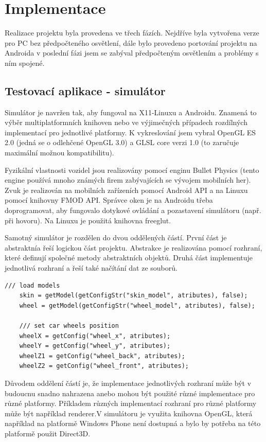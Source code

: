 \documentclass[11pt,twoside,a4paper]{book}
\begin{document}
\chapter{Implementace}
Realizace projektu byla provedena ve třech fázích. Nejdříve byla vytvořena verze pro PC bez předpočteného osvětlení, dále bylo provedeno portování projektu na Android\linebreak a v poslední fázi jsem se zabýval předpočteným osvětlením a problémy s ním spojené.

\section{Testovací aplikace - simulátor}
Simulátor je navržen tak, aby fungoval na X11-Linuxu a Androidu. Znamená to výběr multiplatformních knihoven nebo ve výjimečných případech rozdílných implementací pro jednotlivé platformy. K vykreslování jsem vybral OpenGL ES 2.0 (jedná se o odlehčené OpenGL 3.0) a GLSL core verzi 1.0 (to zaručuje maximální možnou kompatibilitu).

Fyzikální vlastnosti vozidel jsou realizovány pomocí enginu Bullet Physics (tento engine používá mnoho známých firem zabývajících se vývojem mobilních her). Zvuk je realizován na mobilních zařízeních pomocí Android API a na Linuxu pomocí knihovny FMOD API. Správce oken je na Androidu třeba doprogramovat, aby fungovalo dotykové ovládání a pozastavení simulátoru (např. při hovoru). Na Linuxu je použitá knihovna freeglut.

Samotný simulátor je rozdělen do dvou oddělených částí. První část je abstraktní\linebreak a řeší logickou část projektu. Abstrakce je realizována pomocí rozhraní, které definují společné metody abstraktních objektů. Druhá část implementuje jednotlivá rozhraní a řeší také načítání dat ze souborů.
\lstset{language=C++} 
\begin{lstlisting}[caption=Načtení 3D modelu vozidla pomocí abstraktního přístupu]
    /// load models
    skin = getModel(getConfigStr("skin_model", atributes), false);
    wheel = getModel(getConfigStr("wheel_model", atributes), false);

    /// set car wheels position
    wheelX = getConfig("wheel_x", atributes);
    wheelY = getConfig("wheel_y", atributes);
    wheelZ1 = getConfig("wheel_back", atributes);
    wheelZ2 = getConfig("wheel_front", atributes);
\end{lstlisting}
\newpage

Důvodem oddělení částí je, že implementace jednotlivých rozhraní může být v budoucnu snadno nahrazena anebo mohou být použité různé implementace pro různé platformy. Příkladem různých implementací rozhraní pro různé platformy může být například renderer.\linebreak V simulátoru je využita knihovna OpenGL, která například na platformě Windows Phone není dostupná a bylo by potřeba na této platformě použit Direct3D.
\end{document}
